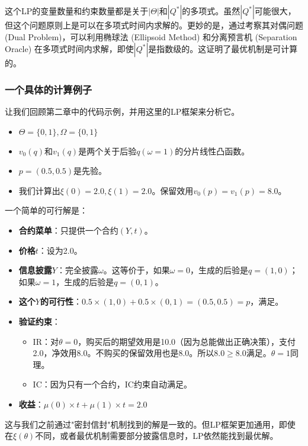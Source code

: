 这个LP的变量数量和约束数量都是关于$|\Theta|$和$|Q^*|$的多项式。虽然$|Q^*|$可能很大，但这个问题原则上是可以在多项式时间内求解的。更妙的是，通过考察其对偶问题 (Dual Problem)，可以利用椭球法 (Ellipsoid Method) 和分离预言机 (Separation Oracle) 在多项式时间内求解，即使$|Q^*|$是指数级的。这证明了最优机制是可计算的。

\subsubsection{一个具体的计算例子}

让我们回顾第二章中的代码示例，并用这里的LP框架来分析它。

\begin{itemize}
    \item $\Theta=\{0,1\},\Omega=\{0,1\}$
    \item $v_0(q)$和$v_1(q)$是两个关于后验$q(\omega=1)$的分片线性凸函数。
    \item $p=(0.5,0.5)$是先验。
    \item 我们计算出$\xi(0)=2.0,\xi(1)=2.0$。保留效用$v_0(p)=v_1(p)=8.0$。
\end{itemize}

一个简单的可行解是：
\begin{itemize}
    \item \textbf{合约菜单}：只提供一个合约$(Y,t)$。
    \item \textbf{价格$t$}：设为2.0。
    \item \textbf{信息披露$Y$}：完全披露$\omega$。这等价于，如果$\omega=0$，生成的后验是$q=(1,0)$；如果$\omega=1$，生成的后验是$q=(0,1)$。
    \item \textbf{这个$Y$的可行性}：$0.5\times (1,0) + 0.5\times (0,1) = (0.5, 0.5)=p$，满足。
    \item \textbf{验证约束}：
       \begin{itemize}
         \item IR：对$\theta=0$，购买后的期望效用是10.0（因为总能做出正确决策），支付2.0，净效用8.0。不购买的保留效用也是8.0。所以$8.0 \geq 8.0$满足。$\theta=1$同理。
         \item IC：因为只有一个合约，IC约束自动满足。
       \end{itemize}
    \item \textbf{收益}：$\mu(0)\times t + \mu(1)\times t = 2.0$
\end{itemize}

这与我们之前通过"密封信封"机制找到的解是一致的。但LP框架更加通用，即使在$\xi(\theta)$不同，或者最优机制需要部分披露信息时，LP依然能找到最优解。

